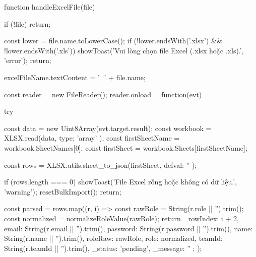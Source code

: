 {            function handleExcelFile(file) {
                if (!file) return;

                const lower = file.name.toLowerCase();
                if (!lower.endsWith('.xlsx') && !lower.endsWith('.xls')) {
                    showToast('Vui lòng chọn file Excel (.xlsx hoặc .xls).', 'error');
                    return;
                }

                excelFileName.textContent = '📄 ' + file.name;

                const reader = new FileReader();
                reader.onload = function(evt) {
                    try {
                        const data = new Uint8Array(evt.target.result);
                        const workbook = XLSX.read(data, { type: 'array' });
                        const firstSheetName = workbook.SheetNames[0];
                        const firstSheet = workbook.Sheets[firstSheetName];

                        const rows = XLSX.utils.sheet_to_json(firstSheet, { defval: '' });

                        if (rows.length === 0) {
                            showToast('File Excel rỗng hoặc không có dữ liệu.', 'warning');
                            resetBulkImport();
                            return;
                        }

                        const parsed = rows.map((r, i) => {
                            const rawRole = String(r.role || '').trim();
                            const normalized = normalizeRoleValue(rawRole);
                            return {
                                _rowIndex: i + 2,
                                email: String(r.email || '').trim(),
                                password: String(r.password || '').trim(),
                                name: String(r.name || '').trim(),
                                roleRaw: rawRole,
                                role: normalized,
                                teamId: String(r.teamId || '').trim(),
                                _status: 'pending',
                                _message: ''
                            };
                        });

}}}}
